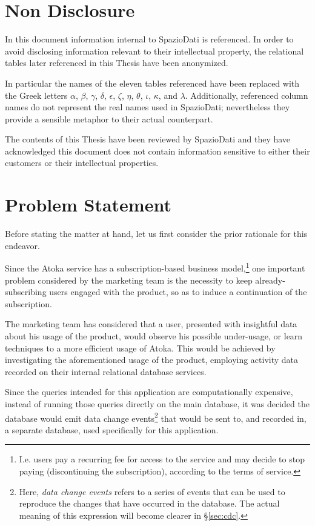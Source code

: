 \section{Non Disclosure}
\label{sec:non-disclosure}

In this document information internal to SpazioDati is referenced.
In order to avoid disclosing information relevant to their intellectual property, the relational tables later referenced in this Thesis have been anonymized.

In particular the names of the eleven tables referenced have been replaced with the Greek letters $\alpha$, $\beta$, $\gamma$, $\delta$, $\epsilon$, $\zeta$, $\eta$, $\theta$, $\iota$, $\kappa$, and $\lambda$.
Additionally, referenced column names do not represent the real names used in SpazioDati; nevertheless they provide a sensible metaphor to their actual counterpart. 

The contents of this Thesis have been reviewed by SpazioDati and they have acknowledged this document does not contain information sensitive to either their customers or their intellectual properties.


\section{Problem Statement}
\label{sec:problem-statement}

Before stating the matter at hand, let us first consider the prior rationale for this endeavor.

Since the Atoka service has a subscription-based business model,\footnote{%
I.e. users pay a recurring fee for access to the service and may decide to stop paying (discontinuing the subscription), according to the terms of service.
} one important problem considered by the marketing team is the necessity to keep already-subscribing users engaged with the product, so as to induce a continuation of the subscription.

The marketing team has considered that a user, presented with insightful data about his usage of the product, would observe his possible under-usage, or learn techniques to a more efficient usage of Atoka.
This would be achieved by investigating the aforementioned usage of the product, employing activity data recorded on their internal relational database services.

Since the queries intended for this application are computationally expensive, instead of running those queries directly on the main database, it was decided the database would emit data change events\footnote{%
Here, \emph{data change events} refers to a series of events that can be used to reproduce the changes that have occurred in the database.
The actual meaning of this expression will become clearer in \S \ref{sec:cdc}.
} that would be sent to, and recorded in, a separate database, used specifically for this application.

